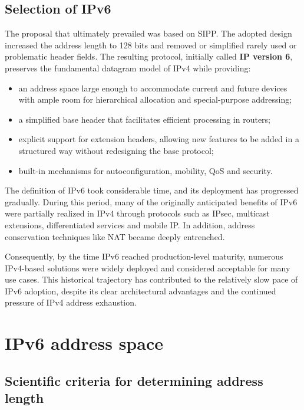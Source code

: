 \subsection{Selection of IPv6}

The proposal that ultimately prevailed was based on SIPP. The adopted design increased the address length to 128 bits and removed or simplified rarely used or problematic header fields. The resulting protocol, initially called \textbf{IP version 6}, preserves the fundamental datagram model of IPv4 while providing:

\begin{itemize}
\item an address space large enough to accommodate current and future devices with ample room for hierarchical allocation and special-purpose addressing;
\item a simplified base header that facilitates efficient processing in routers;
\item explicit support for extension headers, allowing new features to be added in a structured way without redesigning the base protocol;
\item built-in mechanisms for autoconfiguration, mobility, QoS and security.
\end{itemize}

The definition of IPv6 took considerable time, and its deployment has progressed gradually. During this period, many of the originally anticipated benefits of IPv6 were partially realized in IPv4 through protocols such as IPsec, multicast extensions, differentiated services and mobile IP. In addition, address conservation techniques like NAT became deeply entrenched.

Consequently, by the time IPv6 reached production-level maturity, numerous IPv4-based solutions were widely deployed and considered acceptable for many use cases. This historical trajectory has contributed to the relatively slow pace of IPv6 adoption, despite its clear architectural advantages and the continued pressure of IPv4 address exhaustion.

\section{IPv6 address space}

\subsection{Scientific criteria for determining address length}

